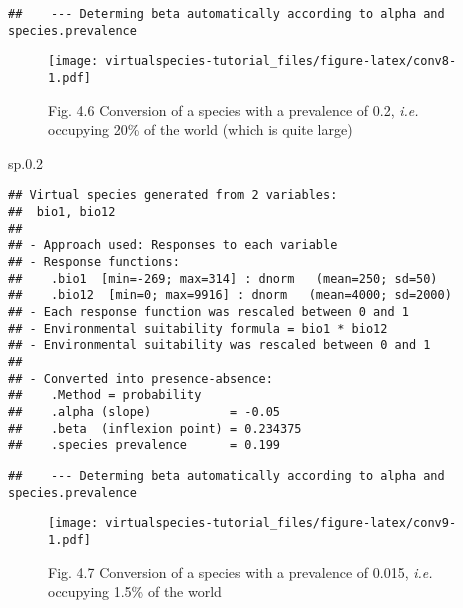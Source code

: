 \documentclass[]{article}
\newenvironment{Shaded}{\begin{snugshade}}{\end{snugshade}}
\newcommand{\KeywordTok}[1]{\textcolor[rgb]{0.13,0.29,0.53}{\textbf{#1}}}
\newcommand{\DataTypeTok}[1]{\textcolor[rgb]{0.13,0.29,0.53}{#1}}
\newcommand{\FloatTok}[1]{\textcolor[rgb]{0.00,0.00,0.81}{#1}}
\newcommand{\StringTok}[1]{\textcolor[rgb]{0.31,0.60,0.02}{#1}}
\newcommand{\CommentTok}[1]{\textcolor[rgb]{0.56,0.35,0.01}{\textit{#1}}}
\newcommand{\OperatorTok}[1]{\textcolor[rgb]{0.81,0.36,0.00}{\textbf{#1}}}
\newcommand{\NormalTok}[1]{#1}
\begin{document}
\begin{verbatim}
##    --- Determing beta automatically according to alpha and species.prevalence
\end{verbatim}

\begin{figure}
\centering
\texttt{[image: virtualspecies-tutorial\_files/figure-latex/conv8-1.pdf]}
\caption{Fig. 4.6 Conversion of a species with a prevalence of 0.2,
\emph{i.e.} occupying 20\% of the world (which is quite large)}
\end{figure}

\begin{Shaded}
\begin{Highlighting}[]
\NormalTok{sp.}\FloatTok{0.2}
\end{Highlighting}
\end{Shaded}

\begin{verbatim}
## Virtual species generated from 2 variables:
##  bio1, bio12
## 
## - Approach used: Responses to each variable
## - Response functions:
##    .bio1  [min=-269; max=314] : dnorm   (mean=250; sd=50)
##    .bio12  [min=0; max=9916] : dnorm   (mean=4000; sd=2000)
## - Each response function was rescaled between 0 and 1
## - Environmental suitability formula = bio1 * bio12
## - Environmental suitability was rescaled between 0 and 1
## 
## - Converted into presence-absence:
##    .Method = probability
##    .alpha (slope)           = -0.05
##    .beta  (inflexion point) = 0.234375
##    .species prevalence      = 0.199
\end{verbatim}

\begin{Shaded}
\end{Shaded}

\begin{verbatim}
##    --- Determing beta automatically according to alpha and species.prevalence
\end{verbatim}

\begin{figure}
\centering
\texttt{[image: virtualspecies-tutorial\_files/figure-latex/conv9-1.pdf]}
\caption{Fig. 4.7 Conversion of a species with a prevalence of 0.015,
\emph{i.e.} occupying 1.5\% of the world}
\end{figure}
\end{document}

